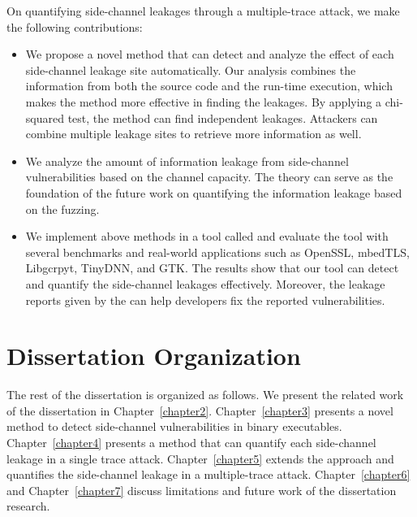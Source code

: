 On quantifying side-channel leakages through a multiple-trace attack, we make the following contributions:
\begin{itemize}
    \item We propose a novel method that can detect and analyze the effect of each side-channel leakage site automatically. Our analysis combines the information from both the source code and the run-time execution, which makes the method more effective in finding the leakages. By applying a chi-squared test, the method can find independent leakages. Attackers can combine multiple leakage sites to retrieve more information as well.
    \item We analyze the amount of information leakage from side-channel vulnerabilities based on the channel capacity. The theory can serve as the foundation of the future work on quantifying the information leakage based on the fuzzing.
    \item We implement above methods in a tool called \ctool{} and evaluate the tool with several benchmarks and real-world applications such as OpenSSL, mbedTLS, Libgcrpyt, TinyDNN, and GTK. The results show that our tool can detect and quantify the side-channel leakages effectively. Moreover, the leakage reports given by the \ctool{} can help developers fix the reported vulnerabilities.
\end{itemize}



\section{Dissertation Organization}
The rest of the dissertation is organized as follows. We present the related work of the dissertation in Chapter~\ref{chapter2}. Chapter~\ref{chapter3} presents a novel method to detect side-channel vulnerabilities in binary executables. Chapter~\ref{chapter4} presents a method that can quantify each side-channel leakage in a single trace attack. Chapter~\ref{chapter5} extends the approach and quantifies the side-channel leakage in a multiple-trace attack.
Chapter~\ref{chapter6} and Chapter~\ref{chapter7} discuss limitations and future work of the dissertation research.
